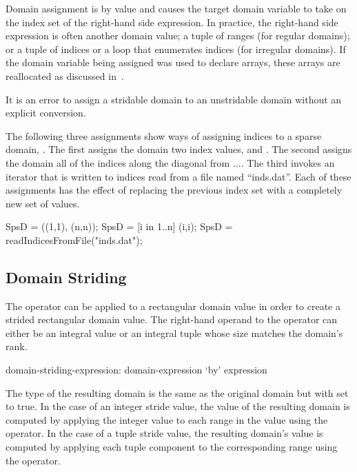 Domain assignment is by
value and causes the target domain variable to take on the index set
of the right-hand side expression.  In practice, the right-hand side
expression is often another domain value; a tuple of ranges (for
regular domains); or a tuple of indices or a loop that enumerates
indices (for irregular domains).  If the domain variable being
assigned was used to declare arrays, these arrays are reallocated as
discussed in~.

It is an error to assign a stridable domain to an unstridable domain
without an explicit conversion.

\begin{example}
The following three assignments show ways of assigning indices to a
sparse domain, .  The first assigns the domain two index
values,  and .  The second assigns the domain
all of the indices along the diagonal from
$\ldots$.  The third invokes an iterator that
is written to  indices read from a file named
``inds.dat''.  Each of these assignments has the effect of replacing
the previous index set with a completely new set of values.
\begin{chapel}
SpsD = ((1,1), (n,n));
SpsD = [i in 1..n] (i,i);
SpsD = readIndicesFromFile("inds.dat");
\end{chapel}
\end{example}

\subsection{Domain Striding}
\label{Domain_Striding}

The  operator can be applied to a rectangular domain value in
order to create a strided rectangular domain value.  The right-hand
operand to the  operator can either be an integral value or
an integral tuple whose size matches the domain's rank.

\begin{syntax}
domain-striding-expression:
  domain-expression `by' expression
\end{syntax}

The type of the resulting domain is the same as the original domain
but with  set to true.  In the case of an integer
stride value, the value of the resulting domain is computed by
applying the integer value to each range in the value using the
 operator.  In the case of a tuple stride value, the resulting
domain's value is computed by applying each tuple component to the
corresponding range using the  operator.


